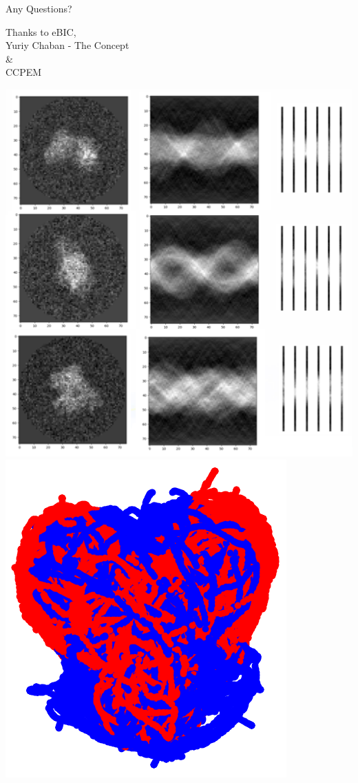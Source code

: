 \documentclass[t, 11pt, xcolor=dvipsnames]{beamer}
\begin{document}
\begin{frame}{Any Questions?}
    \begin{center}
      \begin{minipage}{0.45\textwidth}
        Thanks to eBIC, \\
        Yuriy Chaban - The Concept \\
        \& \\
        CCPEM \\
      \end{minipage}
      \begin{minipage}{0.45\textwidth}
        \begin{center}
          \includegraphics[height=0.4\textheight]{images/proj_sin_lin.png}
          \includegraphics[height=0.4\textheight]{images/UMAP_heart.png}

\end{center}
\end{minipage}
\end{center}
\end{frame}
\end{document}
